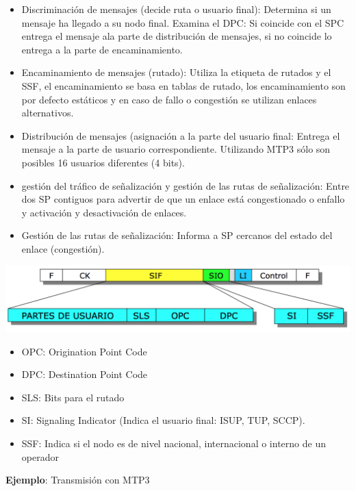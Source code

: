 \documentclass[10pt,portrait, twocolumn]{article}
\begin{document}
	\begin{itemize}
		\item Discriminación de mensajes (decide ruta o usuario final): Determina si un mensaje ha llegado a su nodo final. Examina el DPC: Si coincide con el SPC entrega el mensaje ala parte de distribución de mensajes, si no coincide lo entrega a la parte de encaminamiento.
		\item  Encaminamiento de mensajes (rutado): Utiliza la etiqueta de rutados y el SSF, el encaminamiento se basa en tablas de rutado, los encaminamiento son por defecto estáticos y en caso de fallo o congestión se utilizan enlaces alternativos.
		\item Distribución de mensajes (asignación a la parte del usuario final: Entrega el mensaje a la parte de usuario correspondiente. Utilizando MTP3 sólo son posibles 16 usuarios diferentes (4 bits).
		\item  gestión del tráfico de señalización y gestión de las rutas de señalización: Entre dos SP contiguos para advertir de que un enlace está congestionado o enfallo y activación y desactivación de enlaces.
		\item Gestión de las rutas de señalización: Informa a SP cercanos del estado del enlace (congestión).
	\end{itemize}

	\begin{center}
		\includegraphics[scale = 0.3]{MTP3E}
	\end{center}
	
	\begin{itemize}
		\item OPC: Origination Point Code
		\item DPC: Destination Point Code
		\item SLS: Bits para el rutado
		\item SI: Signaling Indicator (Indica el usuario final: ISUP, TUP, SCCP).
		\item SSF: Indica si el nodo es de nivel nacional, internacional o interno de un operador
	\end{itemize}
	
\textbf{Ejemplo}: Transmisión con MTP3
	
\end{document}
